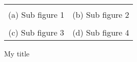 \documentclass[]{article}
\begin{document}
\begin{figure}
	\small
	\begin{tabular}{cc}
		 &  \\
		(a) Sub figure 1 & (b)  Sub figure 2 \\
		 &  \\
		(c)  Sub figure 3 & (d)  Sub figure 4
	\end{tabular} 
	\caption{My title}
\end{figure}
\end{document}
